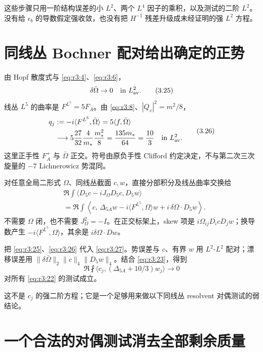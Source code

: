 \documentclass[UTF8,11pt,openany,oneside,fontset=none]{ctexbook}
\begin{document}
这些步骤只用一阶结构误差的小 \(L^2\)、两个 \(L^4\) 因子的乘积，以及测试的二阶 \(L^2\)。没有给 \(\epsilon_b\) 的导数假定强收敛，也没有把 \(H^{-1}\) 残差升级成未经证明的强 \(L^2\) 方程。

\section{同线丛 Bochner 配对给出确定的正势}\label{ch3:ux540cux7ebfux4e1b-bochner-ux914dux5bf9ux7ed9ux51faux786eux5b9aux7684ux6b63ux52bf}

由 Hopf 散度式与 \eqref{eq:r3:4}、\eqref{eq:r3:6}， \[
 \delta\bar\Omega\to0\quad\text{in }L^2_{\rm av}.
 \tag{3.25}\label{eq:r3:25}
\] 线丛 \(L^5\) 的曲率是 \(F^{L^5}=5F_A\)。由 \eqref{eq:r3:8}、\(|Q_v|^2=m^2/8\)， \[
 \begin{aligned}
 \mathfrak q_j&:=-i\langle F^{L^5},\bar\Omega\rangle
       =5\langle f,\bar\Omega\rangle\\
 &\longrightarrow
 5\frac{27}{32}\frac4{m_*}\frac{m_*^2}{8}
   =\frac{135m_*}{64}=\frac{10}{3}
 \quad\text{in }L^2_{\rm av}.
 \end{aligned}
 \tag{3.26}\label{eq:r3:26}
\] 这里正手性 \(F_A^+\) 与 \(\bar\Omega\) 正交。符号由原负手性 Clifford 约定决定，不与第二次三次旋量的 \(-7\) Lichnerowicz 势混同。

对任意全局二形式 \(\Omega\)、同线丛截面 \(c,w\)，直接分部积分及线丛曲率交换给 \[
 \begin{aligned}
 &\Re\int\langle D_5c-iJ_\Omega D_5c,D_5w\rangle\\
 &=\Re\int\left\langle c,\,
    \Delta_{5A}w-i\langle F^{L^5},\Omega\rangle w
                         +i\,\delta\Omega\cdot D_5w\right\rangle.
 \end{aligned}
 \tag{3.27}\label{eq:r3:27}
\] 不需要 \(\Omega\) 闭，也不需要 \(J_\Omega^2=-I\)。在正交标架上，skew 项是 \(i\Omega_{ij}\overline{D_i c}D_jw\)；换导数产生 \(-i\langle F^{L^5},\Omega\rangle\)，其余是 \(i\delta\Omega\cdot Dw\)。

把 \eqref{eq:r3:25}、\eqref{eq:r3:26} 代入 \eqref{eq:r3:27}。势误差与 \(c\)、有界 \(w\) 用 \(L^2\)-\(L^2\) 配对；漂移误差用 \(\|\delta\bar\Omega\|_2\|c\|_4\|D_5w\|_4\)。结合 \eqref{eq:r3:23}，得到 \[
 \boxed{\Re\fint\langle c_j,(\Delta_{5A}+10/3)w_j\rangle\to0}
 \tag{3.28}\label{eq:r3:28}
\] 对所有 \eqref{eq:r3:22} 的测试成立。

这不是 \(c_j\) 的强二阶方程；它是一个足够用来做以下同线丛 resolvent 对偶测试的弱结论。

\section{一个合法的对偶测试消去全部剩余质量}\label{ch3:ux4e00ux4e2aux5408ux6cd5ux7684ux5bf9ux5076ux6d4bux8bd5ux6d88ux53bbux5168ux90e8ux5269ux4f59ux8d28ux91cf}
\end{document}
